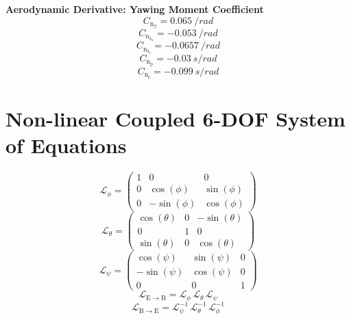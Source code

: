 \documentclass[lettersize,journal]{IEEEtran}
\begin{document}
{\vfill\null
\textbf{Aerodynamic Derivative: Yawing Moment Coefficient}
\begin{equation}
C_{\mathrm{n}_{\mathrm{\beta}}} = 0.065\ /rad
\end{equation}
\begin{equation}
C_{\mathrm{n}_{\mathrm{\delta_{\mathrm{a}}}}} = -0.053\ /rad
\end{equation}
\begin{equation}
C_{\mathrm{n}_{\mathrm{\delta_{\mathrm{r}}}}} = -0.0657\ /rad
\end{equation}
\begin{equation}
C_{\mathrm{n}_{\mathrm{p}}} = -0.03\ s/rad
\end{equation}
\begin{equation}
C_{\mathrm{n}_{\mathrm{r}}} = -0.099\ s/rad
\end{equation}

\newpage

\onecolumn

\section{Non-linear Coupled 6-DOF System of Equations}\label{apdx:EoM}

\begin{equation}
\mathcal{L}_{\phi}=\left(\begin{array}{ccc} 1 & 0 & 0\\ 0 & \cos\left(\phi \right) & \sin\left(\phi \right)\\ 0 & -\sin\left(\phi \right) & \cos\left(\phi \right) \end{array}\right)
\end{equation}
\begin{equation}
\mathcal{L}_{\theta}=\left(\begin{array}{ccc} \cos\left(\theta \right) & 0 & -\sin\left(\theta \right)\\ 0 & 1 & 0\\ \sin\left(\theta \right) & 0 & \cos\left(\theta \right) \end{array}\right)
\end{equation}
\begin{equation}
\mathcal{L}_{\psi}=\left(\begin{array}{ccc} \cos\left(\psi \right) & \sin\left(\psi \right) & 0\\ -\sin\left(\psi \right) & \cos\left(\psi \right) & 0\\ 0 & 0 & 1 \end{array}\right)
\end{equation}
\begin{equation}
\mathcal{L}_{\mathrm{E}\rightarrow\mathrm{B}}=\mathcal{L}_{\phi}\,\mathcal{L}_{\theta}\,\mathcal{L}_{\psi}
\end{equation}
\begin{equation}
\mathcal{L}_{\mathrm{B}\rightarrow\mathrm{E}}=\mathcal{L}_{\psi}^{-1}\,\mathcal{L}_{\theta}^{-1}\,\mathcal{L}_{\phi}^{-1}
\end{equation}

}
\end{document}
